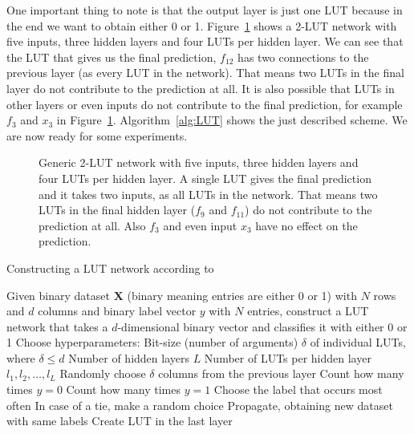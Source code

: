 \noindent One important thing to note is that the output layer is just one LUT because in the end we want to obtain either 0 or 1. Figure~\ref{fig:medium_LUT_network} shows a 2-LUT network with five inputs, three hidden layers and four LUTs per hidden layer. We can see that the LUT that gives us the final prediction, $f_{12}$ has two connections to the previous layer (as every LUT in the network). That means two LUTs in the final layer do not contribute to the prediction at all. It is also possible that LUTs in other layers or even inputs do not contribute to the final prediction, for example $f_3$ and $x_3$ in Figure~\ref{fig:medium_LUT_network}. Algorithm~\ref{alg:LUT} shows the just described scheme. We are now ready for some experiments.

\begin{figure}[!htb]
    \centering
    
    \caption{Generic 2-LUT network with five inputs, three hidden layers and four LUTs per hidden layer. A single LUT gives the final prediction and it takes two inputs, as all LUTs in the network. That means two LUTs in the final hidden layer ($f_9$ and $f_{11}$) do not contribute to the prediction at all. Also $f_3$ and even input $x_3$ have no effect on the prediction.}
\label{fig:medium_LUT_network}
\end{figure}


\begin{algorithm}
  \caption{Constructing a LUT network according to \cite{chatterjee2018learning}}
  \label{alg:LUT}
  \begin{algorithmic}
    \State Given binary dataset $\boldsymbol{X}$ (binary meaning entries are either 0 or 1) with $N$ rows and $d$ columns and binary label vector $y$ with $N$ entries, construct a LUT network that takes a $d$-dimensional binary vector and classifies it with either 0 or 1
    \vspace{1em}
    \State Choose hyperparameters:
      \Statein Bit-size (number of arguments) $\delta$ of individual LUTs, where $\delta \leq d$
      \Statein Number of hidden layers $L$
      \Statein Number of LUTs per hidden layer $l_1, l_2, \dots, l_L$
        \State Randomly choose $\delta$ columns from the previous layer
          \State Count how many times $y=0$
          \State Count how many times $y=1$
          \State Choose the label that occurs most often
          \State In case of a tie, make a random choice
        \EndFor
      \EndFor
      \State Propagate, obtaining new dataset with same labels
    \EndFor
    \State Create LUT in the last layer
  \end{algorithmic}
\end{algorithm}

